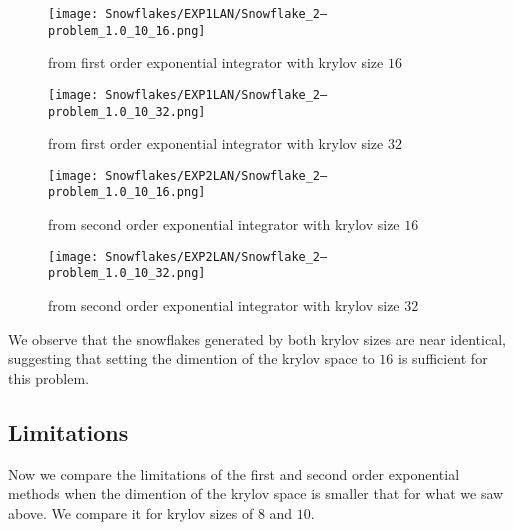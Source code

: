 \begin{figure}[H]
    \centering
    \begin{minipage}{0.49\textwidth}
        \texttt{[image: Snowflakes/EXP1LAN/Snowflake\_2--problem\_1.0\_10\_16.png]} %
        \caption{from first order exponential integrator with krylov size $16$}
        \label{fig:first order 16}
    \end{minipage}\hfill
    \centering
    \begin{minipage}{0.49\textwidth}
        \texttt{[image: Snowflakes/EXP1LAN/Snowflake\_2--problem\_1.0\_10\_32.png]} %
        \caption{from first order exponential integrator with krylov size $32$}
        \label{fig:first order 32}
    \end{minipage}\hfill
\end{figure}\begin{figure}[H]
    \centering
    \begin{minipage}{0.49\textwidth}
        \texttt{[image: Snowflakes/EXP2LAN/Snowflake\_2--problem\_1.0\_10\_16.png]} %
        \caption{from second order exponential integrator with krylov size $16$}
        \label{fig:second order 16}
    \end{minipage}\hfill
    \centering
    \begin{minipage}{0.49\textwidth}
        \texttt{[image: Snowflakes/EXP2LAN/Snowflake\_2--problem\_1.0\_10\_32.png]} %
        \caption{from second order exponential integrator with krylov size $32$}
        \label{fig:second order 32}
    \end{minipage}\hfill
\end{figure}

We observe that the snowflakes generated by both krylov sizes are near identical, 
suggesting that setting the dimention of the krylov space to $16$ is sufficient for this problem.\\

\subsection{Limitations}
Now we compare the limitations of the first and second order exponential methods when the dimention of the krylov space is smaller that for what we saw above.
We compare it for krylov sizes of $8$ and $10$.

